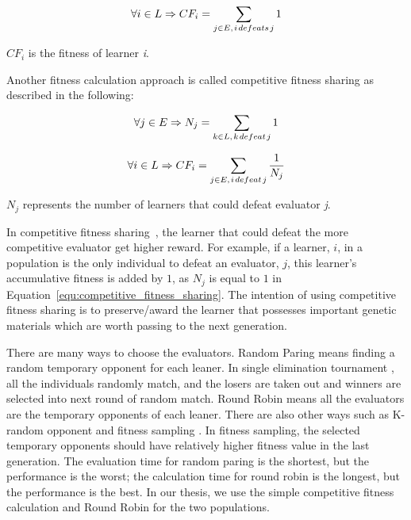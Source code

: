 \begin{equation}\label{equ:simple_fitness_calculation}
\forall i \in L \Rightarrow C{F_i} = \sum\limits_{j \in E,{\kern 1pt} i{\kern 1pt} defeats{\kern 1pt} j} 1
\end{equation}

$C{F_i}$ is the fitness of learner \textit{i}. 

Another fitness calculation approach is called competitive fitness sharing \cite{Rosin_1997} as described in the following:

\begin{equation}
\forall j \in E \Rightarrow {N_j} = \sum\limits_{k \in L,{\kern 1pt} k{\kern 1pt} defeat{\kern 1pt} j} 1
\end{equation}

\begin{equation}\label{equ:competitive_fitness_sharing}
\forall i \in L \Rightarrow C{F_i} = \sum\limits_{j \in E,{\kern 1pt} i{\kern 1pt} defeat{\kern 1pt} j} {\frac{1}{{{N_j}}}}
\end{equation}

${N_j}$ represents the number of learners that could defeat evaluator \textit{j}.  

In competitive fitness sharing~\cite{Rosin_1997}, the learner that could defeat the more competitive evaluator get higher reward. For example, if a learner, $i$, in a population is the only individual to defeat an evaluator, $j$, this learner's accumulative fitness is added by $1$, as $N_j$ is equal to $1$ in Equation~\eqref{equ:competitive_fitness_sharing}.
The intention of using competitive fitness sharing is to preserve/award the learner that possesses important genetic materials which are worth passing to the next generation. 

There are many ways to choose the evaluators. Random Paring \cite{Panait_2002} means finding a random temporary opponent for each leaner. In single elimination tournament \cite{Tan_2007}, all the individuals randomly match, and the losers are taken out and winners are selected into next round of random match. Round Robin \cite{Panait_2002} means all the evaluators are the temporary opponents of each leaner. There are also other ways such as K-random opponent \cite{Tan_2007} and fitness sampling \cite{Rosin_1997}. In fitness sampling, the selected temporary opponents should have relatively higher fitness value in the last generation. The evaluation time for random paring is the shortest, but the performance is the worst; the calculation time for round robin is the longest, but the performance is the best. In our thesis, we use the simple competitive fitness calculation and Round Robin for the two populations. 

